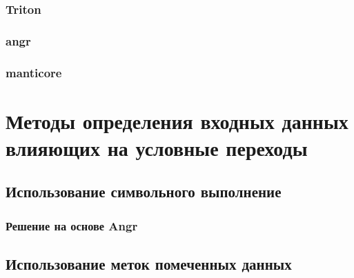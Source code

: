 \subsection{Triton}

\subsection{angr}

\subsection{manticore}










\chapter{Методы определения входных данных влияющих на условные переходы}


\section{Использование символьного выполнение}

\subsection{Решение на основе Angr}


\section{Использование меток помеченных данных}

